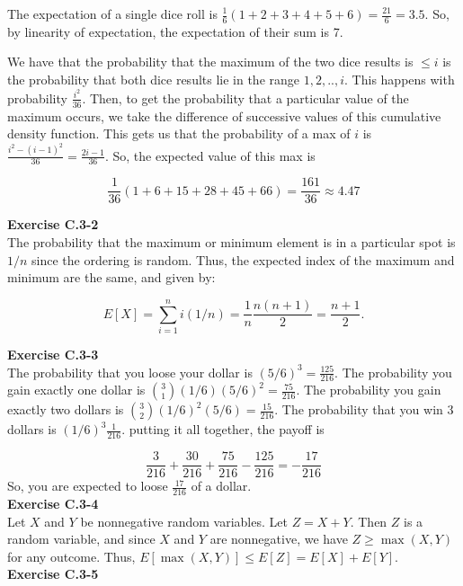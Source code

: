 \documentclass{article}
\begin{document}
The expectation of a single dice roll is $\frac{1}{6}(1+2+3+4+5+6) = \frac{21}{6} = 3.5$. So, by linearity of expectation, the expectation of their sum is 7.

We have that the probability that the maximum of the two dice results is $\le i$ is the probability that both dice results lie in the range $1,2,..,i$. This happens with probability $\frac{i^2}{36}$. Then, to get the probability that a particular value of the maximum occurs, we take the difference of successive values of this cumulative density function. This gets us that the probability of a max of $i$ is $\frac{i^2 - (i-1)^2}{36} = \frac{2i -1}{36}$. So, the expected value of this max is 

\[
\frac{1}{36}( 1 + 6 + 15 + 28 + 45 + 66) = \frac{161}{36} \approx 4.47
\]

\noindent\textbf{Exercise C.3-2}\\

The probability that the maximum or minimum element is in a particular spot is $1/n$ since the ordering is random.  Thus, the expected index of the maximum and minimum are the same, and given by:

\[ E[X] = \sum_{i=1}^n i(1/n) = \frac{1}{n} \frac{n(n+1)}{2} = \frac{n+1}{2}.\]

\noindent\textbf{Exercise C.3-3}\\

The probability that you loose your dollar is $(5/6)^3 =\frac{125}{216}$. The probability you gain exactly one dollar is $\binom{3}{1} (1/6)(5/6)^2 = \frac{75}{216}$. The probability you gain exactly two dollars is $\binom{3}{2} (1/6)^2 (5/6) = \frac{15}{216}$. The probability that you win 3 dollars is $(1/6)^3\frac{1}{216}$. putting it all together, the payoff is

 \[
 \frac{3}{216} + \frac{30}{216} + \frac{75}{216} - \frac{125}{216} = -\frac{17}{216}
  \] 
  So, you are expected to loose $\frac{17}{216}$ of a dollar.\\


\noindent\textbf{Exercise C.3-4}\\

Let $X$ and $Y$ be nonnegative random variables.  Let $Z = X+Y$.  Then $Z$ is a random variable, and since $X$ and $Y$ are nonnegative, we have $Z \geq \max(X,Y)$ for any outcome.  Thus, $E[\max(X,Y)] \leq E[Z] = E[X] + E[Y]$.\\


\noindent\textbf{Exercise C.3-5}\\
\end{document}
